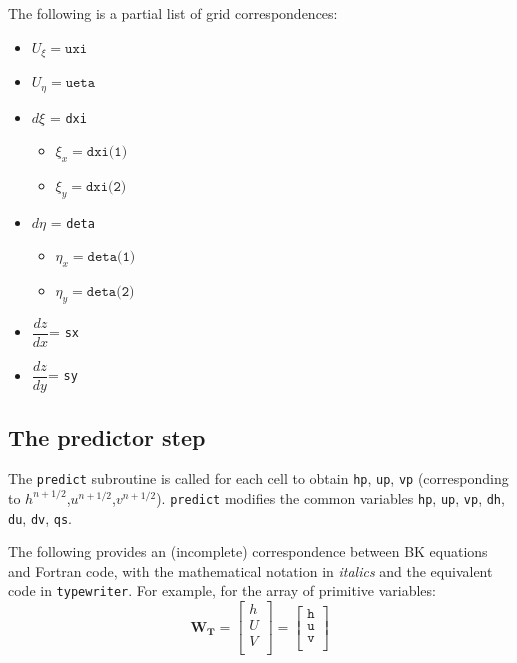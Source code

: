 \documentclass{article}
\newcommand{\code}[1]{\texttt{#1}}
\begin{document}
The following is a partial list of grid correspondences:
\begin{itemize}
	\item $ U_\xi = \code{uxi} $
	\item $ U_\eta = \code{ueta}$
	\item  $d\xi$ = \code{dxi} 
	\begin{itemize}
		\item  $\xi_x = \code{dxi(1)} $
		\item  $\xi_y =\code{dxi(2)}  $
	\end{itemize}
	\item  $d\eta$ = \code{deta} 
	\begin{itemize}
		\item  $\eta_x = \code{deta(1)} $
		\item  $\eta_y =\code{deta(2)}  $
	\end{itemize}	
	\item  $\dfrac{dz}{dx}$= \code{sx}
	\item  $\dfrac{dz}{dy}$= \code{sy}
\end{itemize}

\subsection{The predictor step}

The \code{predict} subroutine is called for each cell to obtain \code{hp}, \code{up},  \code{vp} (corresponding to $h^{n+1/2}$,$u^{n+1/2}$,$v^{n+1/2}$).   \code{predict}  modifies the common variables  \code{hp}, \code{up},  \code{vp}, \code{dh}, \code{du}, \code{dv}, \code{qs}.


The following provides an (incomplete) correspondence between BK equations and Fortran code, with the mathematical notation in \textit{italics} and the equivalent code in \code{typewriter}.   For example, for the array of primitive variables:
\[  \mathbf{W_T} = 
\begin{bmatrix}
	h \\
	U \\
	V \\
\end{bmatrix}
 =  {
	 \begin{bmatrix}
	 \code{h} \\
	 \code{u} \\	 
	 \code{v} \\	 	 	 
\end{bmatrix} 
}  \]
\end{document}
